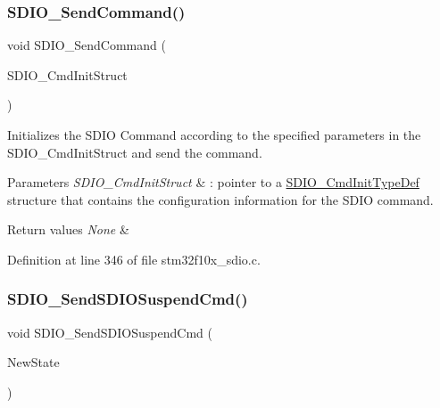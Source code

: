 \subsubsection{\texorpdfstring{S\+D\+I\+O\+\_\+\+Send\+Command()}{SDIO\_SendCommand()}}
{\footnotesize\ttfamily void S\+D\+I\+O\+\_\+\+Send\+Command (\begin{DoxyParamCaption}\item[{\hyperlink{struct_s_d_i_o___cmd_init_type_def}{S\+D\+I\+O\+\_\+\+Cmd\+Init\+Type\+Def} $\ast$}]{S\+D\+I\+O\+\_\+\+Cmd\+Init\+Struct }\end{DoxyParamCaption})}



Initializes the S\+D\+IO Command according to the specified parameters in the S\+D\+I\+O\+\_\+\+Cmd\+Init\+Struct and send the command. 


\begin{DoxyParams}{Parameters}
{\em S\+D\+I\+O\+\_\+\+Cmd\+Init\+Struct} & \+: pointer to a \hyperlink{struct_s_d_i_o___cmd_init_type_def}{S\+D\+I\+O\+\_\+\+Cmd\+Init\+Type\+Def} structure that contains the configuration information for the S\+D\+IO command. \\
\hline
\end{DoxyParams}

\begin{DoxyRetVals}{Return values}
{\em None} & \\
\hline
\end{DoxyRetVals}


Definition at line 346 of file stm32f10x\+\_\+sdio.\+c.

\mbox{\label{group___s_d_i_o___exported___functions_ga9264137a01a1ab81d03bc80a3b3120fc}} 
\subsubsection{\texorpdfstring{S\+D\+I\+O\+\_\+\+Send\+S\+D\+I\+O\+Suspend\+Cmd()}{SDIO\_SendSDIOSuspendCmd()}}
{\footnotesize\ttfamily void S\+D\+I\+O\+\_\+\+Send\+S\+D\+I\+O\+Suspend\+Cmd (\begin{DoxyParamCaption}\item[{\hyperlink{group___exported__types_gac9a7e9a35d2513ec15c3b537aaa4fba1}{Functional\+State}}]{New\+State }\end{DoxyParamCaption})}



